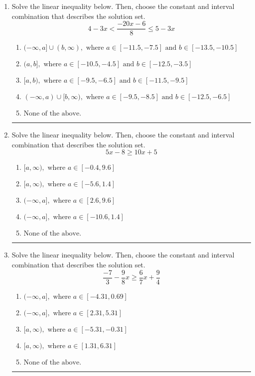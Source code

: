 \documentclass[14pt]{extbook}
\newcommand{\litem}[1]{\item#1\hspace*{-1cm}\rule{\textwidth}{0.4pt}}
\begin{document}
\begin{enumerate}
\litem{
Solve the linear inequality below. Then, choose the constant and interval combination that describes the solution set.\[ 4 - 3 x < \frac{-20 x - 6}{8} \leq 5 - 3 x \]\begin{enumerate}[label=\Alph*.]
\item \( (-\infty, a] \cup (b, \infty), \text{ where } a \in [-11.5, -7.5] \text{ and } b \in [-13.5, -10.5] \)
\item \( (a, b], \text{ where } a \in [-10.5, -4.5] \text{ and } b \in [-12.5, -3.5] \)
\item \( [a, b), \text{ where } a \in [-9.5, -6.5] \text{ and } b \in [-11.5, -9.5] \)
\item \( (-\infty, a) \cup [b, \infty), \text{ where } a \in [-9.5, -8.5] \text{ and } b \in [-12.5, -6.5] \)
\item \( \text{None of the above.} \)

\end{enumerate} }
\litem{
Solve the linear inequality below. Then, choose the constant and interval combination that describes the solution set.\[ 5x -8 \geq 10x + 5 \]\begin{enumerate}[label=\Alph*.]
\item \( [a, \infty), \text{ where } a \in [-0.4, 9.6] \)
\item \( [a, \infty), \text{ where } a \in [-5.6, 1.4] \)
\item \( (-\infty, a], \text{ where } a \in [2.6, 9.6] \)
\item \( (-\infty, a], \text{ where } a \in [-10.6, 1.4] \)
\item \( \text{None of the above}. \)

\end{enumerate} }
\litem{
Solve the linear inequality below. Then, choose the constant and interval combination that describes the solution set.\[ \frac{-7}{3} - \frac{9}{8} x \geq \frac{6}{7} x + \frac{9}{4} \]\begin{enumerate}[label=\Alph*.]
\item \( (-\infty, a], \text{ where } a \in [-4.31, 0.69] \)
\item \( (-\infty, a], \text{ where } a \in [2.31, 5.31] \)
\item \( [a, \infty), \text{ where } a \in [-5.31, -0.31] \)
\item \( [a, \infty), \text{ where } a \in [1.31, 6.31] \)
\item \( \text{None of the above}. \)


\end{enumerate}}
\end{enumerate}
\end{document}
